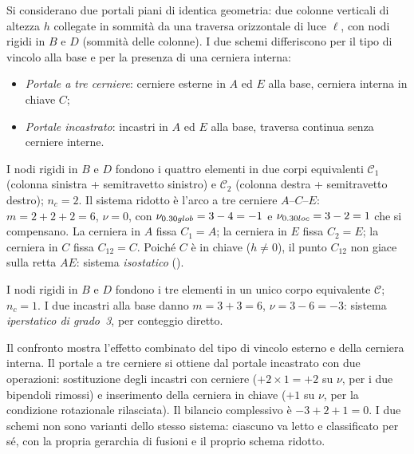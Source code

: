 \begin{esempio}
	\label{ex:portali_confronto}
	Si considerano due portali piani di identica geometria:
	due colonne verticali di altezza $h$ collegate in
	sommità da una traversa orizzontale di luce $\ell$,
	con nodi rigidi in $B$ e $D$ (sommità delle colonne).
	I due schemi differiscono per il tipo di vincolo alla
	base e per la presenza di una cerniera interna:
	\begin{itemize}[nosep]
		\item \emph{Portale a tre cerniere}: cerniere
		esterne in $A$ ed $E$ alla base, cerniera interna
		in chiave $C$;
		\item \emph{Portale incastrato}: incastri in $A$
		ed $E$ alla base, traversa continua senza
		cerniere interne.
	\end{itemize}
	


	
	
	\begin{svolgimento}
		I nodi rigidi in $B$ e $D$ fondono i quattro
		elementi in due corpi equivalenti $\mathcal{C}_1$
		(colonna sinistra + semitravetto sinistro) e
		$\mathcal{C}_2$ (colonna destra + semitravetto
		destro); $n_c = 2$. Il sistema ridotto è l'arco
		a tre cerniere $A$--$C$--$E$: $m = 2+2+2 = 6$,
		$\nu = 0$, con $\nu_{\rm glob} = 3-4 = -1$ e
		$\nu_{\rm loc} = 3-2 = 1$ che si compensano.
		La cerniera in $A$ fissa $C_1 = A$; la cerniera
		in $E$ fissa $C_2 = E$; la cerniera in $C$
		fissa $C_{12} = C$. Poiché $C$ è in chiave
		($h \neq 0$), il punto $C_{12}$ non giace sulla
		retta $AE$: sistema \textit{isostatico}
		().
	\end{svolgimento}
	
	\esottotit{Portale incastrato.}
	\begin{svolgimento}
		I nodi rigidi in $B$ e $D$ fondono i tre elementi in un unico corpo equivalente $\mathcal{C}$; $n_c = 1$. I due incastri alla base danno $m = 3+3 = 6$, $\nu = 3 - 6 = -3$: sistema \textit{iperstatico di grado~3}, per conteggio
		diretto.
		
		\begin{oss}
			Il confronto mostra l'effetto combinato del tipo
			di vincolo esterno e della cerniera interna. Il
			portale a tre cerniere si ottiene dal portale
			incastrato con due operazioni: sostituzione degli
			incastri con cerniere ($+2 \times 1 = +2$ su
			$\nu$, per i due bipendoli rimossi) e inserimento
			della cerniera in chiave ($+1$ su $\nu$, per la
			condizione rotazionale rilasciata). Il bilancio
			complessivo è $-3 + 2 + 1 = 0$. I due schemi
			non sono varianti dello stesso sistema: ciascuno
			va letto e classificato per sé, con la propria
			gerarchia di fusioni e il proprio schema ridotto.
		\end{oss}
	\end{svolgimento}
\end{esempio}